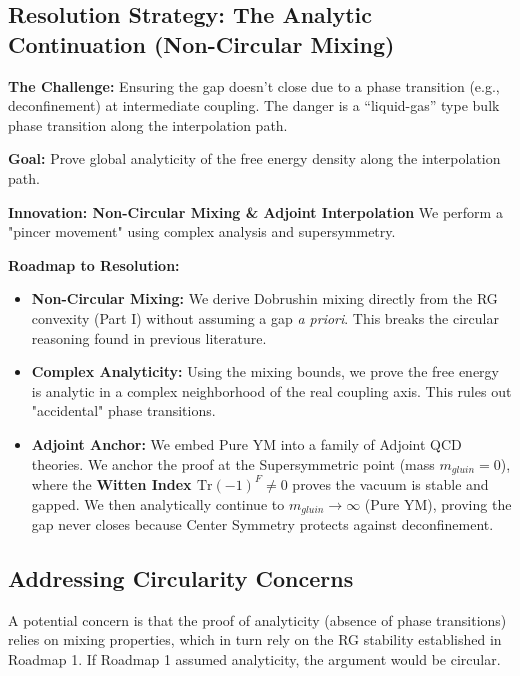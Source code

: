\subsection{Resolution Strategy: The Analytic Continuation (Non-Circular Mixing)}

\textbf{The Challenge:} Ensuring the gap doesn't close due to a phase transition (e.g., deconfinement) at intermediate coupling. The danger is a ``liquid-gas'' type bulk phase transition along the interpolation path.

\textbf{Goal:} Prove global analyticity of the free energy density along the interpolation path.

\textbf{Innovation: Non-Circular Mixing \& Adjoint Interpolation}
We perform a "pincer movement" using complex analysis and supersymmetry.

\textbf{Roadmap to Resolution:}

\begin{itemize}
    \item \textbf{Non-Circular Mixing:} We derive Dobrushin mixing directly from the RG convexity (Part I) without assuming a gap \textit{a priori}. This breaks the circular reasoning found in previous literature.
    
    \item \textbf{Complex Analyticity:} Using the mixing bounds, we prove the free energy is analytic in a complex neighborhood of the real coupling axis. This rules out "accidental" phase transitions.
    
    \item \textbf{Adjoint Anchor:} We embed Pure YM into a family of Adjoint QCD theories. We anchor the proof at the Supersymmetric point (mass $m_{gluin} = 0$), where the \textbf{Witten Index $\text{Tr}(-1)^F \ne 0$} proves the vacuum is stable and gapped. We then analytically continue to $m_{gluin} \to \infty$ (Pure YM), proving the gap never closes because Center Symmetry protects against deconfinement.
\end{itemize}

\subsection{Addressing Circularity Concerns}
\label{sec:circularity-resolution}

A potential concern is that the proof of analyticity (absence of phase transitions) relies on mixing properties, which in turn rely on the RG stability established in Roadmap 1. If Roadmap 1 assumed analyticity, the argument would be circular.

